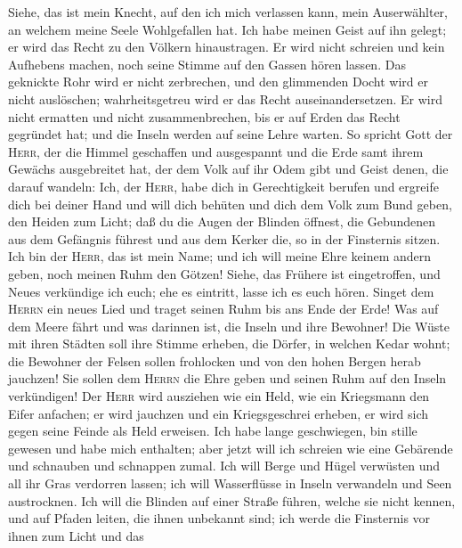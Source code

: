  Siehe, das ist mein Knecht, auf den ich mich verlassen
kann, mein Auserwählter, an welchem meine Seele Wohlgefallen hat. Ich
habe meinen Geist auf ihn gelegt; er wird das Recht zu den Völkern
hinaustragen.  Er wird nicht schreien und kein Aufhebens
machen, noch seine Stimme auf den Gassen hören lassen. 
Das geknickte Rohr wird er nicht zerbrechen, und den glimmenden Docht
wird er nicht auslöschen; wahrheitsgetreu wird er das Recht
auseinandersetzen.  Er wird nicht ermatten und nicht
zusammenbrechen, bis er auf Erden das Recht gegründet hat; und die
Inseln werden auf seine Lehre warten.  So spricht Gott der
\textsc{Herr}, der die Himmel geschaffen und ausgespannt und die Erde
samt ihrem Gewächs ausgebreitet hat, der dem Volk auf ihr Odem gibt und
Geist denen, die darauf wandeln:  Ich, der \textsc{Herr},
habe dich in Gerechtigkeit berufen und ergreife dich bei deiner Hand und
will dich behüten und dich dem Volk zum Bund geben, den Heiden zum
Licht;  daß du die Augen der Blinden öffnest, die
Gebundenen aus dem Gefängnis führest und aus dem Kerker die, so in der
Finsternis sitzen.  Ich bin der \textsc{Herr}, das ist
mein Name; und ich will meine Ehre keinem andern geben, noch meinen Ruhm
den Götzen!  Siehe, das Frühere ist eingetroffen, und
Neues verkündige ich euch; ehe es eintritt, lasse ich es euch hören.
 Singet dem \textsc{Herrn} ein neues Lied und traget
seinen Ruhm bis ans Ende der Erde! Was auf dem Meere fährt und was
darinnen ist, die Inseln und ihre Bewohner!  Die Wüste
mit ihren Städten soll ihre Stimme erheben, die Dörfer, in welchen Kedar
wohnt; die Bewohner der Felsen sollen frohlocken und von den hohen
Bergen herab jauchzen!  Sie sollen dem \textsc{Herrn} die
Ehre geben und seinen Ruhm auf den Inseln verkündigen! 
Der \textsc{Herr} wird ausziehen wie ein Held, wie ein Kriegsmann den
Eifer anfachen; er wird jauchzen und ein Kriegsgeschrei erheben, er wird
sich gegen seine Feinde als Held erweisen.  Ich habe
lange geschwiegen, bin stille gewesen und habe mich enthalten; aber
jetzt will ich schreien wie eine Gebärende und schnauben und schnappen
zumal.  Ich will Berge und Hügel verwüsten und all ihr
Gras verdorren lassen; ich will Wasserflüsse in Inseln verwandeln und
Seen austrocknen.  Ich will die Blinden auf einer Straße
führen, welche sie nicht kennen, und auf Pfaden leiten, die ihnen
unbekannt sind; ich werde die Finsternis vor ihnen zum Licht und das
